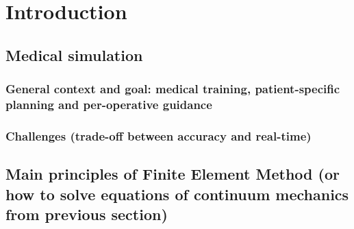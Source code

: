 \part{Introduction}

	\chapter{Medical simulation}
		\section{General context and goal: medical training, patient-specific planning and per-operative guidance}
		\section{Challenges (trade-off between accuracy and real-time)}

	

	\chapter{Main principles of Finite Element Method (or how to solve equations of continuum mechanics from previous section)}
